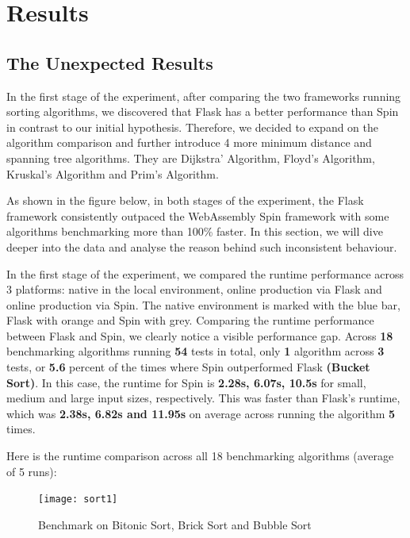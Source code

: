 \chapter{Results} \label{chap:results}

\bigskip
\section{The Unexpected Results}

In the first stage of the experiment, after comparing the two frameworks running sorting algorithms, we discovered that Flask has a better performance than Spin in contrast to our initial hypothesis. Therefore, we decided to expand on the algorithm comparison and further introduce 4 more minimum distance and spanning tree algorithms. They are Dijkstra' Algorithm, Floyd's Algorithm, Kruskal's Algorithm and Prim's Algorithm.

As shown in the figure below, in both stages of the experiment, the Flask framework consistently outpaced the WebAssembly Spin framework with some algorithms benchmarking more than 100\% faster. In this section, we will dive deeper into the data and analyse the reason behind such inconsistent behaviour.

In the first stage of the experiment, we compared the runtime performance across 3 platforms: native in the local environment, online production via Flask and online production via Spin. The native environment is marked with the blue bar, Flask with orange and Spin with grey. Comparing the runtime performance between Flask and Spin, we clearly notice a visible performance gap. Across \textbf{18} benchmarking algorithms running \textbf{54} tests in total, only \textbf{1} algorithm across \textbf{3} tests, or \textbf{5.6} percent of the times where Spin outperformed Flask \textbf{(Bucket Sort)}. In this case, the runtime for Spin is \textbf{2.28s, 6.07s, 10.5s} for small, medium and large input sizes, respectively. This was faster than Flask's runtime, which was \textbf{2.38s, 6.82s and 11.95s} on average across running the algorithm \textbf{5} times.

Here is the runtime comparison across all 18 benchmarking algorithms (average of 5 runs):

\newpage
\bigskip
\begin{figure}[hp]
\centering
\texttt{[image: sort1]}
\caption{\footnotesize{Benchmark on Bitonic Sort, Brick Sort and Bubble Sort}}
\captionsetup{aboveskip=0pt,font=it}
\end{figure}
\bigskip

